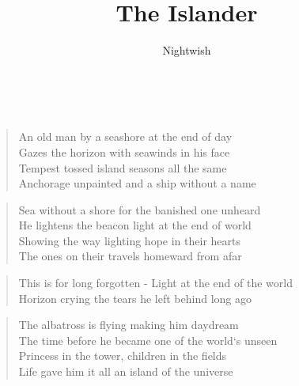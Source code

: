 \documentclass[9pt,a4paper,oneside, onecolumn]{article}
\author{Nightwish}
\title{The Islander}
\date{}
\begin{document}
\maketitle
\thispagestyle{empty}

\mbox{
}\\

\begin{verse}
An old man by a seashore at the end of day\\
Gazes the horizon with seawinds in his face\\
Tempest tossed island seasons all the same\\
Anchorage unpainted and a ship without a name\\
\end{verse}

\begin{verse}
Sea without a shore for the banished one unheard\\
He lightens the beacon light at the end of world\\
Showing the way lighting hope in their hearts\\
The ones on their travels homeward from afar\\
\end{verse}

\begin{verse}
This is for long forgotten -
Light at the end of the world\\
Horizon crying
the tears he left behind long ago\qquad{}\
\end{verse}

\begin{verse}
The albatross is flying making him daydream\\
The time before \upchord{G}he became one \upchord{A}of the world`s un\upchord{Hm}seen\\
Princess in the tower, children in the fields\\
Life gave him it all an island of the universe\\
\end{verse}
\end{document}
